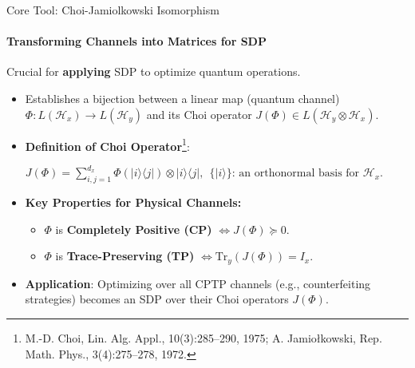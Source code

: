 \documentclass{beamer}
\begin{document}
\begin{frame}{Core Tool: Choi-Jamiolkowski Isomorphism}
    \framesubtitle{Transforming Channels into Matrices for SDP}
    Crucial for \textbf{applying} SDP to optimize quantum operations.
    \pause
    \begin{itemize}
        \item Establishes a bijection between a linear map (quantum channel) $\Phi: L(\mathcal{H}_x) \to L(\mathcal{H}_y)$ and its Choi operator $J(\Phi) \in L(\mathcal{H}_y \otimes \mathcal{H}_x)$.
        \item \textbf{Definition of Choi Operator}\footnote{M.-D. Choi, Lin. Alg. Appl., 10(3):285–290, 1975; A. Jamio{\l}kowski, Rep. Math. Phys., 3(4):275–278, 1972.}:
        
        $ J(\Phi) = \sum_{i,j=1}^{d_x} \Phi(|i\rangle\langle j|) \otimes |i\rangle\langle j|,\ \ \{|i\rangle\} \text{: an orthonormal basis for } \mathcal{H}_x. $
        
        \item \textbf{Key Properties for Physical Channels:}
            \begin{itemize}
                \item $\Phi$ is \textbf{Completely Positive (CP)} $\iff J(\Phi) \succeq 0$.
                \item $\Phi$ is \textbf{Trace-Preserving (TP)} $\iff \mathrm{Tr}_y(J(\Phi)) = I_x$.
            \end{itemize}
        \pause
        \item \textbf{Application}: Optimizing over all CPTP channels (e.g., counterfeiting strategies) becomes an SDP over their Choi operators $J(\Phi)$.
    \end{itemize}
\end{frame}
\end{document}
